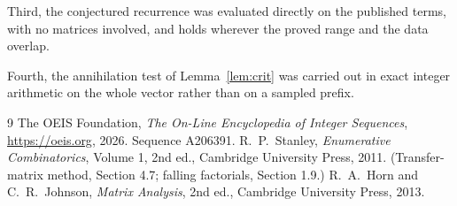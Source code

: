 \documentclass[11pt,a4paper]{article}
\theoremstyle{plain}
\theoremstyle{definition}
\begin{document}
Third, the conjectured recurrence was evaluated directly on the published terms, with no
matrices involved, and holds wherever the proved range and the data overlap.

Fourth, the annihilation test of Lemma~\ref{lem:crit} was carried out in exact integer
arithmetic on the whole vector rather than on a sampled prefix.

\begin{thebibliography}{9}
 The OEIS Foundation, \emph{The On-Line Encyclopedia of Integer
Sequences}, \url{https://oeis.org}, 2026. Sequence A206391.
 R.~P.~Stanley, \emph{Enumerative Combinatorics}, Volume 1, 2nd ed.,
Cambridge University Press, 2011. (Transfer-matrix method, Section 4.7; falling factorials,
Section 1.9.)
 R.~A.~Horn and C.~R.~Johnson, \emph{Matrix Analysis}, 2nd ed., Cambridge
University Press, 2013.
\end{thebibliography}
\end{document}
